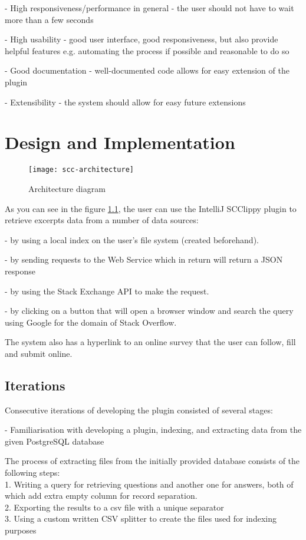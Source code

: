 \documentclass{l4proj}
\begin{document}
- High responsiveness/performance in general - the user should not have to wait more than a few seconds 

- High usability - good user interface, good responsiveness, but also provide helpful features e.g. automating the process if possible and reasonable to do so

- Good documentation - well-documented code allows for easy extension of the plugin

- Extensibility - the system should allow for easy future extensions

\chapter{Design and Implementation}

\begin{figure}[h]
\caption{Architecture diagram}
\texttt{[image: scc-architecture]}
\centering
\label{fig:architecture}
\end{figure}
As you can see in the figure \ref{fig:architecture}, the 
user can use the IntelliJ SCClippy plugin to retrieve excerpts data from a number of data sources:

- by using a local index on the user's file system (created beforehand).

- by sending requests to the Web Service which in return will return a JSON response

- by using the Stack Exchange API to make the request.

- by clicking on a button that will open a browser window and search the query using Google for the domain of Stack Overflow. 

The system also has a hyperlink to an online survey that the user can follow, fill and submit online.

\section{Iterations}
Consecutive iterations of developing the plugin consisted of several stages:

- Familiarisation with developing a plugin, indexing, and extracting data from the given PostgreSQL database

The process of extracting files from the initially provided database consists of the following steps:\\
1. Writing a query for retrieving questions and another one for answers, both of which add extra empty column for record separation.\\
2. Exporting the results to a csv file with a unique separator\\
3. Using a custom written CSV splitter to create the files used for indexing purposes
\end{document}
